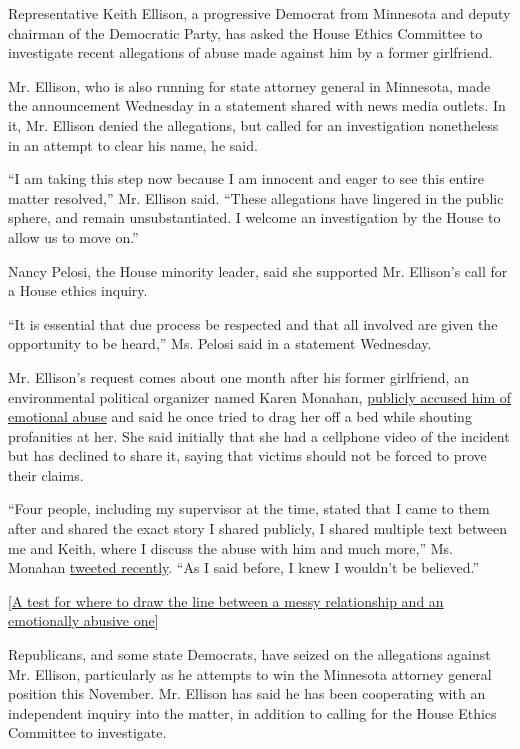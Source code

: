 Representative Keith Ellison, a progressive Democrat from Minnesota and
deputy chairman of the Democratic Party, has asked the House Ethics
Committee to investigate recent allegations of abuse made against him by
a former girlfriend.

Mr. Ellison, who is also running for state attorney general in
Minnesota, made the announcement Wednesday in a statement shared with
news media outlets. In it, Mr. Ellison denied the allegations, but
called for an investigation nonetheless in an attempt to clear his name,
he said.

``I am taking this step now because I am innocent and eager to see this
entire matter resolved,'' Mr. Ellison said. ``These allegations have
lingered in the public sphere, and remain unsubstantiated. I welcome an
investigation by the House to allow us to move on.''

Nancy Pelosi, the House minority leader, said she supported Mr.
Ellison's call for a House ethics inquiry.

``It is essential that due process be respected and that all involved
are given the opportunity to be heard,'' Ms. Pelosi said in a statement
Wednesday.

Mr. Ellison's request comes about one month after his former girlfriend,
an environmental political organizer named Karen Monahan,
\href{https://www.nytimes3xbfgragh.onion/2018/08/13/us/politics/keith-ellison-abuse-karen-monahan.html}{publicly
accused him of emotional abuse} and said he once tried to drag her off a
bed while shouting profanities at her. She said initially that she had a
cellphone video of the incident but has declined to share it, saying
that victims should not be forced to prove their claims.

``Four people, including my supervisor at the time, stated that I came
to them after and shared the exact story I shared publicly, I shared
multiple text between me and Keith, where I discuss the abuse with him
and much more,'' Ms. Monahan
\href{https://twitter.com/KarenMonahan01/status/1041675772329570304}{tweeted
recently}. ``As I said before, I knew I wouldn't be believed.''

{[}\href{https://www.nytimes3xbfgragh.onion/2018/08/30/us/keith-elllison-karen-monahan.html}{A
test for where to draw the line between a messy relationship and an
emotionally abusive one}{]}

Republicans, and some state Democrats, have seized on the allegations
against Mr. Ellison, particularly as he attempts to win the Minnesota
attorney general position this November. Mr. Ellison has said he has
been cooperating with an independent inquiry into the matter, in
addition to calling for the House Ethics Committee to investigate.

